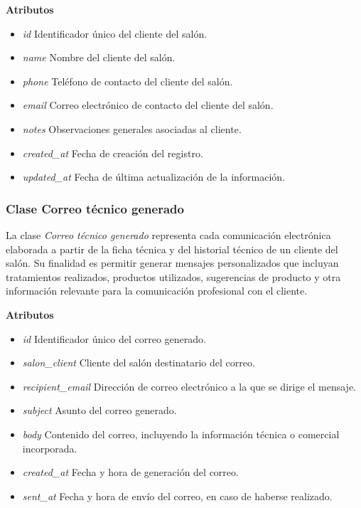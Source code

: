 \textbf{Atributos}

\begin{itemize}

      \item \textit{id}
            Identificador único del cliente del salón.
      \item \textit{name}
            Nombre del cliente del salón.
      \item \textit{phone}
            Teléfono de contacto del cliente del salón.
      \item \textit{email}
            Correo electrónico de contacto del cliente del salón.
      \item \textit{notes}
            Observaciones generales asociadas al cliente.
      \item \textit{created\_at}
            Fecha de creación del registro.
      \item \textit{updated\_at}
            Fecha de última actualización de la información.

\end{itemize}

\subsubsection{Clase Correo técnico generado}

La clase \textit{Correo técnico generado} representa cada comunicación electrónica elaborada a partir de la ficha técnica y del historial técnico de un cliente del salón. Su finalidad es permitir generar mensajes personalizados que incluyan tratamientos realizados, productos utilizados, sugerencias de producto y otra información relevante para la comunicación profesional con el cliente.

\textbf{Atributos}

\begin{itemize}

      \item \textit{id}
            Identificador único del correo generado.
      \item \textit{salon\_client}
            Cliente del salón destinatario del correo.
      \item \textit{recipient\_email}
            Dirección de correo electrónico a la que se dirige el mensaje.
      \item \textit{subject}
            Asunto del correo generado.
      \item \textit{body}
            Contenido del correo, incluyendo la información técnica o comercial incorporada.
      \item \textit{created\_at}
            Fecha y hora de generación del correo.
      \item \textit{sent\_at}
            Fecha y hora de envío del correo, en caso de haberse realizado.

\end{itemize}

